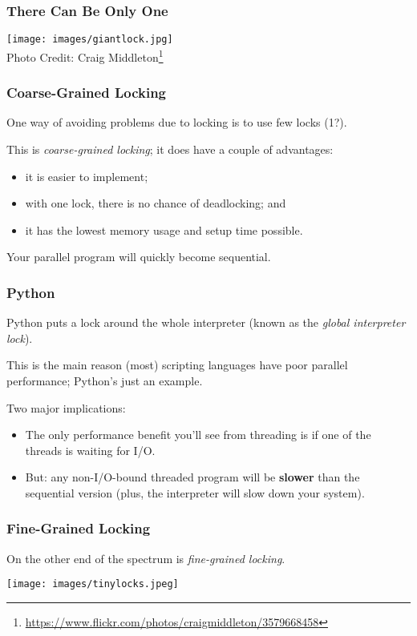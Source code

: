 \begin{frame}
\frametitle{There Can Be Only One}

\begin{center}
	\texttt{[image: images/giantlock.jpg]}\\
	\hfill Photo Credit: Craig Middleton\footnote{\url{https://www.flickr.com/photos/craigmiddleton/3579668458}}
\end{center}


\end{frame}


\begin{frame}
\frametitle{Coarse-Grained Locking}

One way of avoiding problems due to locking is to use few locks
(1?). 

This is \emph{coarse-grained locking}; it does have a couple of advantages:
  \begin{itemize}
    \item it is easier to implement;
    \item with one lock, there is no chance of deadlocking; and
    \item it has the lowest memory usage and setup time possible.
  \end{itemize}

Your parallel program will quickly become sequential.


\end{frame}

\begin{frame}
\frametitle{Python}

Python puts a lock around the whole interpreter (known as the
\emph{global interpreter lock}).  

This is the main reason (most) scripting languages have poor parallel performance; Python's just an example.

Two major implications:
\begin{itemize}
\item The only performance benefit you'll see from threading is if one of the threads is
      waiting for I/O.
\item But: any non-I/O-bound threaded program will be {\bf slower} than the sequential
      version (plus, the interpreter will slow down your system).
\end{itemize}


\end{frame}

\begin{frame}
\frametitle{Fine-Grained Locking}

On the other end of the spectrum is \emph{fine-grained locking}. 


\begin{center}
	\texttt{[image: images/tinylocks.jpeg]}
\end{center}


\end{frame}

